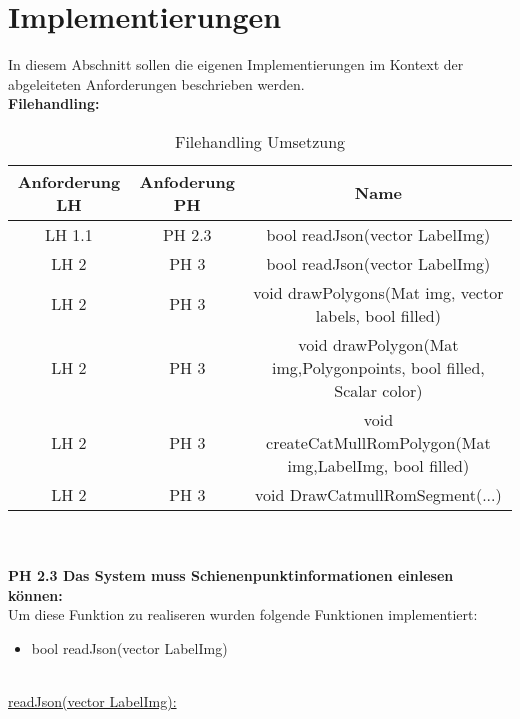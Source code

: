 \section{Implementierungen}
\label{sec:Implementierungen}

In diesem Abschnitt sollen die eigenen Implementierungen im Kontext der abgeleiteten Anforderungen beschrieben werden.
\\

\noindent
\textbf{Filehandling:}
\\

\noindent
\begin{table}[h]
\scriptsize
\begin{tabular}[h]{c|c|c}
Anforderung LH & Anfoderung PH & Name \\
\hline
 LH 1.1 & PH 2.3 & bool  readJson(vector LabelImg)\\
LH 2 & PH 3 & bool readJson(vector LabelImg)\\
LH 2 & PH 3 &void drawPolygons(Mat img, vector labels, bool filled)\\
LH 2 & PH 3 & void drawPolygon(Mat img,Polygonpoints, bool filled, Scalar color)\\
LH 2 & PH 3 &void createCatMullRomPolygon(Mat img,LabelImg, bool filled)\\
LH 2 & PH 3 &void DrawCatmullRomSegment(...)\\
\end{tabular}
\caption{Filehandling Umsetzung}
\end{table}
\\
\\

\noindent
\textbf{PH 2.3 Das System muss Schienenpunktinformationen einlesen können:}
\\

\noindent
Um diese Funktion zu realiseren wurden folgende Funktionen implementiert:
\begin{itemize}
	\item bool readJson(vector LabelImg)
\end{itemize}

\noindent
\\
\noindent
\underline{readJson(vector LabelImg):}
\\

